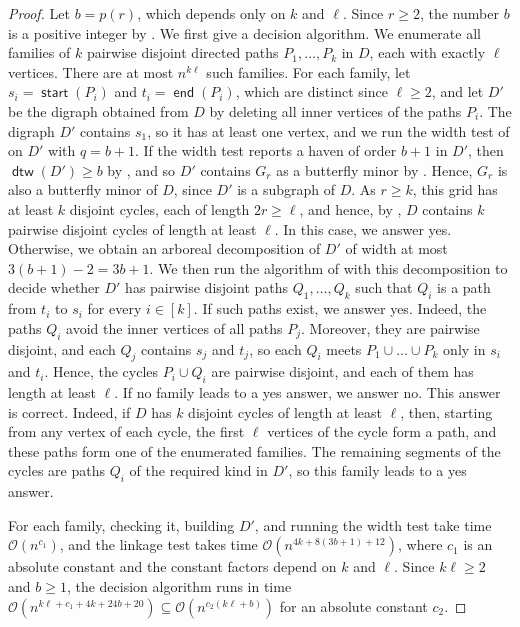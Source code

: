 \documentclass[fontsize=12pt,leading=14pt]{fullpaper}
\DeclareMathOperator{\st}{\mathsf{start}}
\DeclareMathOperator{\en}{\mathsf{end}}
\DeclareMathOperator{\dtw}{\mathsf{dtw}}
\begin{document}
\begin{proof}
  Let $b=p(r)$, which depends only on $k$ and $\ell$.
  Since $r\ge2$, the number $b$ is a positive integer by .
  We first give a decision algorithm.
  We enumerate all families of $k$ pairwise disjoint directed paths $P_1,\dots,P_k$ in $D$, each with exactly $\ell$ vertices.
  There are at most $n^{k\ell}$ such families.
  For each family, let $s_i=\st(P_i)$ and $t_i=\en(P_i)$, which are distinct since $\ell\ge2$, and let $D'$ be the digraph obtained from $D$ by deleting all inner vertices of the paths $P_i$.
  The digraph $D'$ contains $s_1$, so it has at least one vertex, and we run the width test of  on $D'$ with $q=b+1$.
  If the width test reports a haven of order $b+1$ in $D'$, then $\dtw(D')\ge b$ by , and so $D'$ contains $G_r$ as a butterfly minor by .
  Hence, $G_r$ is also a butterfly minor of $D$, since $D'$ is a subgraph of $D$.
  As $r\ge k$, this grid has at least $k$ disjoint cycles, each of length $2r\ge\ell$, and hence, by , $D$ contains $k$ pairwise disjoint cycles of length at least $\ell$.
  In this case, we answer yes.
  Otherwise, we obtain an arboreal decomposition of $D'$ of width at most $3(b+1)-2=3b+1$.
  We then run the algorithm of  with this decomposition to decide whether $D'$ has pairwise disjoint paths $Q_1,\dots,Q_k$ such that $Q_i$ is a path from $t_i$ to $s_i$ for every $i\in[k]$.
  If such paths exist, we answer yes.
  Indeed, the paths $Q_i$ avoid the inner vertices of all paths $P_j$.
  Moreover, they are pairwise disjoint, and each $Q_j$ contains $s_j$ and $t_j$, so each $Q_i$ meets $P_1\cup\dots\cup P_k$ only in $s_i$ and $t_i$.
  Hence, the cycles $P_i\cup Q_i$ are pairwise disjoint, and each of them has length at least $\ell$.
  If no family leads to a yes answer, we answer no.
  This answer is correct.
  Indeed, if $D$ has $k$ disjoint cycles of length at least $\ell$, then, starting from any vertex of each cycle, the first $\ell$ vertices of the cycle form a path, and these paths form one of the enumerated families.
  The remaining segments of the cycles are paths $Q_i$ of the required kind in $D'$, so this family leads to a yes answer.

  For each family, checking it, building $D'$, and running the width test take time $\mathcal{O}(n^{c_1})$, and the linkage test takes time $\mathcal{O}(n^{4k+8(3b+1)+12})$, where $c_1$ is an absolute constant and the constant factors depend on $k$ and $\ell$.
  Since $k\ell\ge2$ and $b\ge1$, the decision algorithm runs in time $\mathcal{O}(n^{k\ell+c_1+4k+24b+20})\subseteq\mathcal{O}(n^{c_2(k\ell+b)})$ for an absolute constant $c_2$.


\end{proof}
\end{document}
